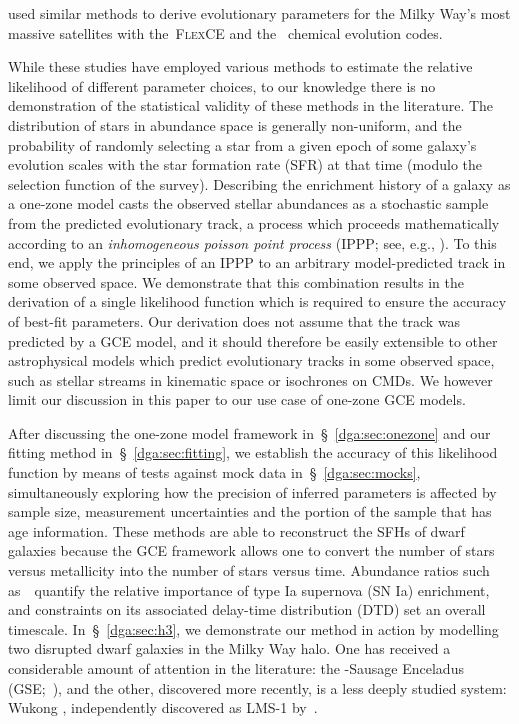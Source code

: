 \citet{Hasselquist2021} used similar methods to derive evolutionary parameters
for the Milky Way's most massive satellites with the~\textsc{FlexCE}
\citep{Andrews2017} and the~\citet{Lian2018, Lian2020b} chemical evolution
codes.
\par
While these studies have employed various methods to estimate the relative
likelihood of different parameter choices, to our knowledge there is no
demonstration of the statistical validity of these methods in the literature.
The distribution of stars in abundance space is generally non-uniform, and the
probability of randomly selecting a star from a given epoch of some galaxy's
evolution scales with the star formation rate (SFR) at that time (modulo the
selection function of the survey).
Describing the enrichment history of a galaxy as a one-zone model casts the
observed stellar abundances as a stochastic sample from the predicted
evolutionary track, a process which proceeds mathematically according to an
\textit{inhomogeneous poisson point process} (IPPP; see, e.g.,
\citealt{Press2007}).
To this end, we apply the principles of an IPPP to an arbitrary model-predicted
track in some observed space.
We demonstrate that this combination results in the derivation of a single
likelihood function which is required to ensure the accuracy of best-fit
parameters.
Our derivation does not assume that the track was predicted by a GCE model,
and it should therefore be easily extensible to other astrophysical models
which predict evolutionary tracks in some observed space, such as stellar
streams in kinematic space or isochrones on CMDs.
We however limit our discussion in this paper to our use case of one-zone GCE
models.
\par
After discussing the one-zone model framework in~\S~\ref{dga:sec:onezone} and
our fitting method in~\S~\ref{dga:sec:fitting}, we establish the accuracy of this
likelihood function by means of tests against mock data in~\S~\ref{dga:sec:mocks},
simultaneously exploring how the precision of inferred parameters is affected
by sample size, measurement uncertainties and the portion of the sample that
has age information.
These methods are able to reconstruct the SFHs of dwarf galaxies because the
GCE framework allows one to convert the number of stars versus metallicity into
the number of stars versus time.
Abundance ratios such as~\afe~quantify the relative importance of type Ia
supernova (SN Ia) enrichment, and constraints on its associated delay-time
distribution (DTD) set an overall timescale.
In~\S~\ref{dga:sec:h3}, we demonstrate our method in action by modelling two
disrupted dwarf galaxies in the Milky Way halo.
One has received a considerable amount of attention in the literature: the
\gaia-Sausage Enceladus (GSE;~\citealp{Belokurov2018, Helmi2018}), and the
other, discovered more recently, is a less deeply studied system: Wukong
\citep{Naidu2020, Naidu2022}, independently discovered as LMS-1
by~\citet{Yuan2020}.
